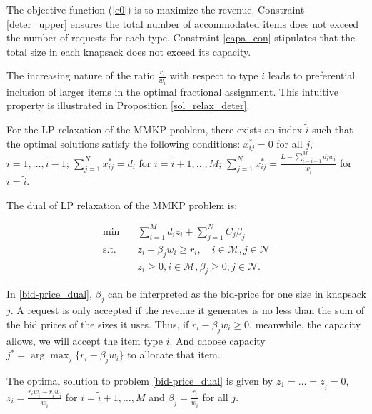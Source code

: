 The objective function (\ref{e0}) is to maximize the revenue. Constraint \eqref{deter_upper} ensures the total number of accommodated items does not exceed the number of requests for each type. Constraint \eqref{capa_con} stipulates that the total size in each knapsack does not exceed its capacity.


The increasing nature of the ratio $\frac{r_i}{w_i}$ with respect to type $i$ leads to preferential inclusion of larger items in the optimal fractional assignment. This intuitive property is illustrated in Proposition \ref{sol_relax_deter}. 


\begin{prop}\label{sol_relax_deter}
For the LP relaxation of the \textup{MMKP} problem, there exists an index $\tilde{i}$ such that the optimal solutions satisfy the following conditions: $x_{ij}^{*} = 0$ for all $j$, $i = 1,\ldots, \tilde{i}-1$; $\sum_{j=1}^{N} x_{ij}^{*} = d_{i}$ for $i = \tilde{i}+1,\ldots, M$; $\sum_{j=1}^{N} x_{ij}^{*} = \frac{L - \sum_{i = \tilde{i}+1}^{M} {d_i w_i}}{w_{\tilde{i}}}$ for $i = \tilde{i}$.
\end{prop}

The dual of LP relaxation of the MMKP problem is:

\begin{equation}\label{bid-price_dual}
    \begin{aligned}
    \min \quad & \sum_{i=1}^{M} d_i z_i + \sum_{j= 1}^{N} C_j \beta_{j} \\
    \text {s.t.} \quad & z_{i} + \beta_j w_i \geq r_i, \quad i \in \mathcal{M}, j \in \mathcal{N} \\
    & z_{i} \geq 0, i \in \mathcal{M}, \beta_{j} \geq 0, j \in \mathcal{N}.
    \end{aligned}
  \end{equation}

In \eqref{bid-price_dual}, $\beta_{j}$ can be interpreted as the bid-price for one size in knapsack $j$. A request is only accepted if the revenue it generates is no less than the sum of the bid prices of the sizes it uses. Thus, if $r_i -\beta_{j} w_i \geq 0$, meanwhile, the capacity allows, we will accept the item type $i$. And choose capacity $j^{*} = \arg \max_{j} \{r_i -\beta_{j} w_i\}$ to allocate that item.
  
\begin{lem}\label{bid-price}
The optimal solution to problem \eqref{bid-price_dual} is given by $z_1 = \ldots = z_{\tilde{i}} =0$, $z_{i} = \frac{r_{i} w_{\tilde{i}} - r_{\tilde{i}} w_{\tilde{i}}}{w_{\tilde{i}}}$ for $i = \tilde{i}+1, \ldots, M$ and $\beta_j = \frac{r_{\tilde{i}}}{w_{\tilde{i}}}$ for all $j$.
\end{lem}

